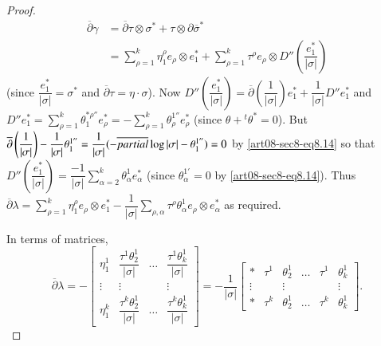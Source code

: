 \begin{proof}
\begin{align*}
\overline{\partial}\gamma &= \overline{\partial}\tau \otimes \sigma^{*}+\tau\otimes \partial \overline{\sigma}^{*}\\
&= \sum\limits^{k}_{\rho=1}\eta^{\rho}_{1}e_{\rho}\otimes e^{*}_{1}+\sum\limits^{k}_{\rho=1}\tau^{\rho}e_{\rho}\otimes D''\left(\dfrac{e^{*}_{1}}{|\sigma|}\right)
\end{align*}
(since $\dfrac{e^{*}_{1}}{|\sigma|}=\sigma^{*}$ and $\overline{\partial}\tau=\eta\cdot \sigma$). Now $D''\left(\dfrac{e^{*}_{1}}{|\sigma|}\right)=\overline{\partial}\left(\dfrac{1}{|\sigma|}\right)e^{*}_{1}+\dfrac{1}{|\sigma|}D''e^{*}_{1}$ and $D''e^{*}_{1}=\sum\limits^{k}_{\rho=1}\theta^{*\rho''}_{1}e^{*}_{\rho}=-\sum\limits^{k}_{\rho=1}\theta^{1''}_{\rho}e^{*}_{\rho}$ (since $\theta+{}^{t}\theta^{*}=0$). But $\overline{\partial}\left(\dfrac{1}{|\sigma|}\right)-\dfrac{1}{|\sigma|}\theta^{1''}_{1}=\dfrac{1}{|\sigma|}(-\overline{\\partial}\log |\sigma|-\theta^{1''}_{1})=0$ by \eqref{art08-sec8-eq8.14} so that $D''\left(\dfrac{e^{*}_{1}}{|\sigma|}\right)=\dfrac{-1}{|\sigma|}\sum\limits^{k}_{\alpha=2}\theta^{1}_{\alpha}e^{*}_{\alpha}$ (since $\theta^{1'}_{\alpha}=0$ by \eqref{art08-sec8-eq8.14}). Thus $\overline{\partial}\lambda=\sum\limits^{k}_{\rho=1}\eta^{\rho}_{1}e_{\rho}\otimes e^{*}_{1}-\dfrac{1}{|\sigma|}\sum\limits_{\rho,\alpha}\tau^{\rho}\theta^{1}_{\alpha}e_{\rho}\otimes e^{*}_{\alpha}$ as required.

In terms of matrices,
\begin{equation*}
\overline{\partial}\lambda=-
\begin{bmatrix}
\eta^{1}_{1} & \dfrac{\tau^{1}\theta^{1}_{2}}{|\sigma|} & \ldots & \dfrac{\tau^{1}\theta^{1}_{k}}{|\sigma|}\\
\vdots & \vdots & & \vdots\\
\eta^{k}_{1} & \dfrac{\tau^{k}\theta^{1}_{2}}{|\sigma|} & \ldots & \dfrac{\tau^{k}\theta^{1}_{k}}{|\sigma|}
\end{bmatrix}
=-\dfrac{1}{|\sigma|}
\begin{bmatrix}
* & \tau^{1} & \theta^{1}_{2} & \ldots & \tau^{1} & \theta^{1}_{k}\\
\vdots & & \vdots & & & \vdots\\
* & \tau^{k} & \theta^{1}_{2} & \ldots & \tau^{k} & \theta^{1}_{k}
\end{bmatrix}.\tag{8.21}\label{art08-sec8-eq8.21}
\end{equation*}
\end{proof}

